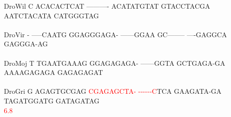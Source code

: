 \documentclass[11pt,twoside,reqno,a4paper]{article}
\begin{document}
{DroWil	C	ACACACTCAT	----------	ACATATGTAT	GTACCTACGA	AATCTACATA	CATGGGTAG\\
\hspace*{7\charwidth}\hspace*{1\charwidth}\hspace*{1\charwidth}\hspace*{1\charwidth}\hspace*{1\charwidth}\hspace*{1\charwidth}\hspace*{1\charwidth}\\
DroVir	-	-----CAATG	GGAGGGAGA-	------GGAA	GC--------	----GAGGCA	GAGGGA-AG\\
\hspace*{7\charwidth}\hspace*{1\charwidth}\hspace*{1\charwidth}\hspace*{1\charwidth}\hspace*{1\charwidth}\hspace*{1\charwidth}\hspace*{1\charwidth}\\
DroMoj	T	TGAATGAAAG	GGAGAGAGA-	------GGTA	GCTGAGA-GA	AAAAGAGAGA	GAGAGAGAT\\
\hspace*{7\charwidth}\hspace*{1\charwidth}\hspace*{1\charwidth}\hspace*{1\charwidth}\hspace*{1\charwidth}\hspace*{1\charwidth}\hspace*{1\charwidth}\\
DroGri	G	AGAGTGCGAG	\textcolor{Red}{C}\textcolor{Red}{G}\textcolor{Red}{A}\textcolor{Red}{G}\textcolor{Red}{A}\textcolor{Red}{G}\textcolor{Red}{C}\textcolor{Red}{T}\textcolor{Red}{A}\textcolor{Red}{-}	\textcolor{Red}{-}\textcolor{Red}{-}\textcolor{Red}{-}\textcolor{Red}{-}\textcolor{Red}{-}\textcolor{Red}{-}\textcolor{Red}{C}TCA	GAAGATA-GA	TAGATGGATG	GATAGATAG\\
\hspace*{7\charwidth}\hspace*{1\charwidth}\hspace*{1\charwidth}\hspace*{11\charwidth}\textcolor{Red}{6.8}\hspace*{1\charwidth}\hspace*{1\charwidth}\hspace*{1\charwidth}\hspace*{1\charwidth}\\
}
\end{document}
